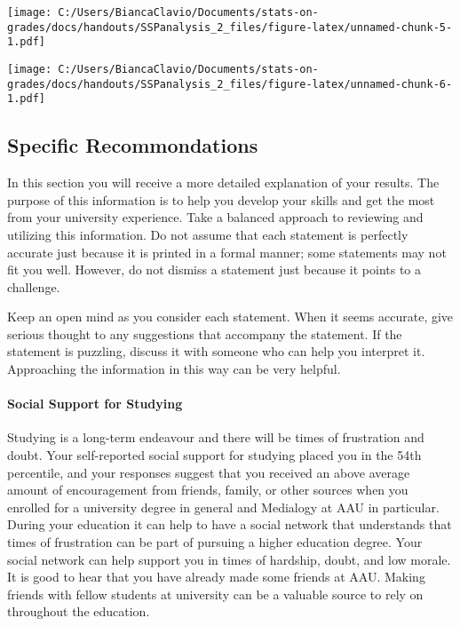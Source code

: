 \documentclass[]{article}
\let\oldparagraph\paragraph
\renewcommand{\paragraph}[1]{\oldparagraph{#1}\mbox{}}
\begin{document}
\texttt{[image: C:/Users/BiancaClavio/Documents/stats-on-grades/docs/handouts/SSPanalysis\_2\_files/figure-latex/unnamed-chunk-5-1.pdf]}

\texttt{[image: C:/Users/BiancaClavio/Documents/stats-on-grades/docs/handouts/SSPanalysis\_2\_files/figure-latex/unnamed-chunk-6-1.pdf]}

\pagebreak

\subsection{Specific Recommondations}\label{specific-recommondations}

In this section you will receive a more detailed explanation of your
results. The purpose of this information is to help you develop your
skills and get the most from your university experience. Take a balanced
approach to reviewing and utilizing this information. Do not assume that
each statement is perfectly accurate just because it is printed in a
formal manner; some statements may not fit you well. However, do not
dismiss a statement just because it points to a challenge.

Keep an open mind as you consider each statement. When it seems
accurate, give serious thought to any suggestions that accompany the
statement. If the statement is puzzling, discuss it with someone who can
help you interpret it. Approaching the information in this way can be
very helpful.

\paragraph{Social Support for
Studying}\label{social-support-for-studying}

Studying is a long-term endeavour and there will be times of frustration
and doubt. Your self-reported social support for studying placed you in
the 54th percentile, and your responses suggest that you received an
above average amount of encouragement from friends, family, or other
sources when you enrolled for a university degree in general and
Medialogy at AAU in particular. During your education it can help to
have a social network that understands that times of frustration can be
part of pursuing a higher education degree. Your social network can help
support you in times of hardship, doubt, and low morale. It is good to
hear that you have already made some friends at AAU. Making friends with
fellow students at university can be a valuable source to rely on
throughout the education.
\end{document}
